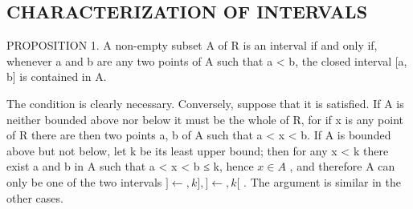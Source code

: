\subsection{CHARACTERIZATION OF INTERVALS}

PROPOSITION 1. A non-empty subset A of R is an interval if and only if, whenever a and b are any two points of A such that a \textless{} b, the closed interval {[}a, b{]} is contained in A.

The condition is clearly necessary. Conversely, suppose that it is satisfied. If A is neither bounded above nor below it must be the whole of R, for if x is any point of R there are then two points a, b of A such that a \textless{} x \textless{} b. If A is bounded above but not below, let k be its least upper bound; then for any x \textless{} k there exist a and b in A such that a \textless{} x \textless{} b ≤ k, hence \(x \in A\) , and therefore A can only be one of the two intervals \(] \leftarrow, k],] \leftarrow, k[\) . The argument is similar in the other cases.

